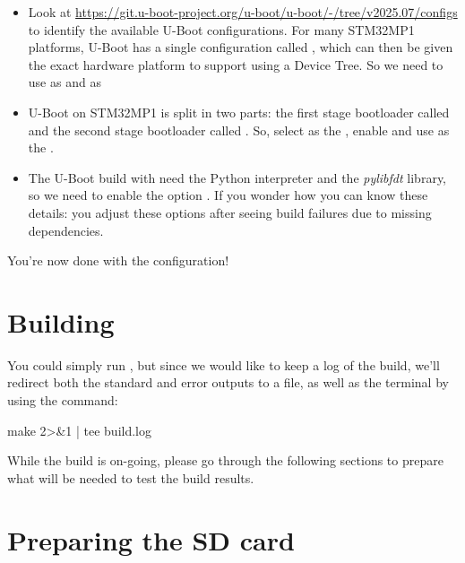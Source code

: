 \begin{itemize}
\begin{itemize}
  \item Look at
    \url{https://git.u-boot-project.org/u-boot/u-boot/-/tree/v2025.07/configs}
    to identify the available U-Boot configurations. For many STM32MP1
    platforms, U-Boot has a single configuration called
    , which can then be given the exact
    hardware platform to support using a Device Tree. So we need to
    use  as  and
     as 

  \item U-Boot on STM32MP1 is split in two parts: the first stage
    bootloader called  and the second stage
    bootloader called . So, select 
    as the , enable  and use  as the
    .

  \item The U-Boot build with need the Python interpreter and the {\em
    pylibfdt} library, so we need to enable the option . If you wonder how you can know these details: you
    adjust these options after seeing build failures due to missing
    dependencies.

  \end{itemize}

\end{itemize}

You're now done with the configuration!

\section{Building}

You could simply run , but since we would like to keep a
log of the build, we'll redirect both the standard and error outputs
to a file, as well as the terminal by using the  command:

\begin{bashinput}
make 2>&1 | tee build.log
\end{bashinput}

While the build is on-going, please go through the following sections
to prepare what will be needed to test the build results.



\section{Preparing the SD card}

